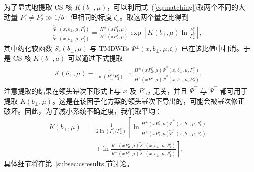 为了显式地提取 CS 核 $K\left(b_{\perp}, \mu\right)$，可以利用式~(\ref{eq:matching})取两个不同的大动量 $P_1^z\neq P_2^z\gg1/b_{\perp}$ 但相同的标度 $\zeta_z$。取这两个量之比得到
\begin{align}
	\frac{\tilde \Psi^{\pm}(x, b_{\perp}, \mu,P_1^z)}{\tilde \Psi^{\pm}(x, b_{\perp}, \mu, P_2^z)}=\frac{H^{\pm}\left(xP_1^z,\mu \right)}{H^{\pm}\left(xP_2^z,\mu \right)}\exp\left[K(b_{\perp},\mu) \ln\frac{P_1^z}{P_2^z}\right], \label{eq:ratioofquasiWF}
\end{align}
其中约化软函数 $S_r(b_{\perp},\mu)$ 与 TMDWFs $\Psi^{\pm}(x,b_{\perp},\mu,\zeta)$ 已在该比值中相消。于是 CS 核 $K\left(b_{\perp}, \mu\right)$ 可以通过下式提取
\begin{align}
	K\left(b_{\perp}, \mu\right)=\frac{1}{\ln(P_1^z/P_2^z)} \ln\frac{H^{\pm}(xP_2^z,\mu)\tilde{\Psi}^{\pm}(x,b_{\perp},\mu,P_1^z)}{H^{\pm}(xP_1^z,\mu)\tilde{\Psi}^{\pm}(x,b_{\perp},\mu,P_2^z)}. \label{eq:extractingCSkernel}
\end{align}
注意提取的结果在领头幂次下形式上与 $x$ 及 $P_{1/2}^z$ 无关，并且 $\tilde{\Psi}^{+}$ 与 $\tilde{\Psi}^{-}$ 都可用于提取 $K\left(b_{\perp}, \mu\right)$。这是在该因子化方案的领头幂次下导出的，可能会被幂次修正破坏。因此，为了减小系统不确定度，我们取平均：
 \begin{align}
	K\left(b_{\perp}, \mu\right)=&\frac{1}{2\ln(P_1^z/P_2^z)} \left[\ln\frac{H^{+}(xP_2^z,\mu)\tilde{\Psi}^{+}(x,b_{\perp},\mu,P_1^z)}{H^{+}(xP_1^z,\mu)\tilde{\Psi}^{+}(x,b_{\perp},\mu,P_2^z)}\right.  \nonumber\\
	&+\left.\ln\frac{H^{-}(xP_2^z,\mu)\tilde{\Psi}^{-}(x,b_{\perp},\mu,P_1^z)}{H^{-}(xP_1^z,\mu)\tilde{\Psi}^{-}(x,b_{\perp},\mu,P_2^z)}\right].
\end{align}
具体细节将在第~\ref{subsec:csresults}节讨论。
